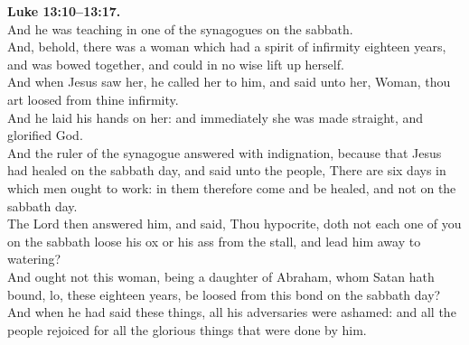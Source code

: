 \documentclass[10pt]{article} %
\begin{document}
{\begin{minipage}[t]{0.45\textwidth}
\textbf{Luke 13:10--13:17.}\\
And he was teaching in one of the synagogues on the sabbath.\\
And, behold, there was a woman which had a spirit of infirmity eighteen years, and was bowed together, and could in no wise lift up herself.\\
And when Jesus saw her, he called her to him, and said unto her, Woman, thou art loosed from thine infirmity.\\
And he laid his hands on her: and immediately she was made straight, and glorified God.\\
And the ruler of the synagogue answered with indignation, because that Jesus had healed on the sabbath day, and said unto the people, There are six days in which men ought to work: in them therefore come and be healed, and not on the sabbath day.\\
The Lord then answered him, and said, Thou hypocrite, doth not each one of you on the sabbath loose his ox or his ass from the stall, and lead him away to watering?\\
And ought not this woman, being a daughter of Abraham, whom Satan hath bound, lo, these eighteen years, be loosed from this bond on the sabbath day?\\
And when he had said these things, all his adversaries were ashamed: and all the people rejoiced for all the glorious things that were done by him.\\

\end{minipage}}
\vspace*{\fill}
\newpage
\huge%
\vspace*{\fill}
\begin{spacing}{1.0}
\end{spacing}
\vspace*{\fill}
\end{document}
